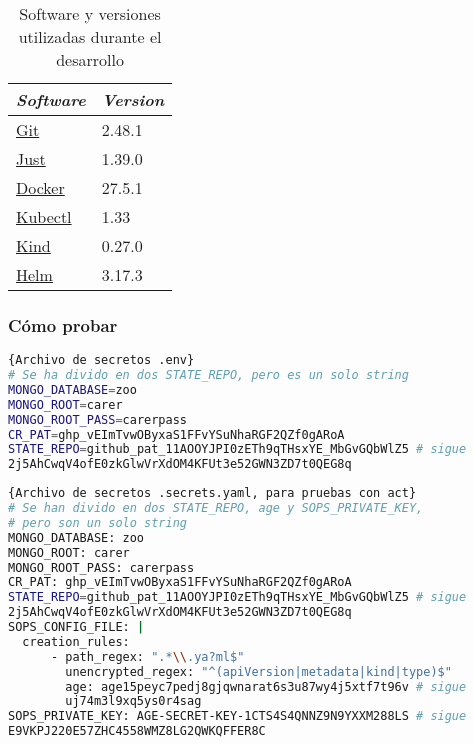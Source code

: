 \begin{table}
  \centering
  \begin{tabular}{|l|l|}
    \hline
    \textit{Software} & \textit{Version} \\ \hline
    \href{https://git-scm.com/book/en/v2/Getting-Started-Installing-Git}{Git} & 2.48.1 \\ \hline
    \href{https://github.com/casey/just?tab=readme-ov-file#installation}{Just} & 1.39.0 \\ \hline
    \href{https://docs.docker.com/desktop/}{Docker} & 27.5.1 \\ \hline
    \href{https://kubernetes.io/docs/tasks/tools/#kubectl}{Kubectl} & 1.33 \\ \hline
    \href{https://kubernetes.io/docs/tasks/tools/#kind}{Kind} & 0.27.0 \\ \hline
    \href{https://helm.sh/docs/intro/install/}{Helm} & 3.17.3 \\ \hline
  \end{tabular}
  \caption{Software y versiones utilizadas durante el desarrollo}
  \label{table:software}
\end{table}

\subsubsection*{Cómo probar}

\begin{lstlisting}[language=bash,label=lst:env-file]{Archivo de secretos .env}
# Se ha divido en dos STATE_REPO, pero es un solo string
MONGO_DATABASE=zoo
MONGO_ROOT=carer
MONGO_ROOT_PASS=carerpass
CR_PAT=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
STATE_REPO=github_pat_11AOOYJPI0zETh9qTHsxYE_MbGvGQbWlZ5 # sigue
2j5AhCwqV4ofE0zkGlwVrXdOM4KFUt3e52GWN3ZD7t0QEG8q
\end{lstlisting}

\begin{lstlisting}[language=bash,label=lst:secrets-file]{Archivo de secretos .secrets.yaml, para pruebas con act}
# Se han divido en dos STATE_REPO, age y SOPS_PRIVATE_KEY,
# pero son un solo string
MONGO_DATABASE: zoo
MONGO_ROOT: carer
MONGO_ROOT_PASS: carerpass
CR_PAT: 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
STATE_REPO=github_pat_11AOOYJPI0zETh9qTHsxYE_MbGvGQbWlZ5 # sigue
2j5AhCwqV4ofE0zkGlwVrXdOM4KFUt3e52GWN3ZD7t0QEG8q
SOPS_CONFIG_FILE: |
  creation_rules:
      - path_regex: ".*\\.ya?ml$"
        unencrypted_regex: "^(apiVersion|metadata|kind|type)$"
        age: age15peyc7pedj8gjqwnarat6s3u87wy4j5xtf7t96v # sigue
        uj74m3l9xq5ys0r4sag
SOPS_PRIVATE_KEY: AGE-SECRET-KEY-1CTS4S4QNNZ9N9YXXM288LS # sigue
E9VKPJ220E57ZHC4558WMZ8LG2QWKQFFER8C
\end{lstlisting}



